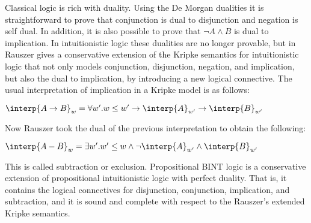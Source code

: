 Classical logic is rich with duality.  Using the De Morgan dualities
it is straightforward to prove that conjunction is dual to disjunction
and negation is self dual.  In addition, it is also possible to prove
that $\lnot A \land B$ is dual to implication.  In intuitionistic
logic these dualities are no longer provable, but in
\cite{Rauszer:1974} Rauszer gives a conservative extension of the
Kripke semantics for intuitionistic logic that not only models
conjunction, disjunction, negation, and implication, but also the dual
to implication, by introducing a new logical connective. The usual
interpretation of implication in a Kripke model is as follows:
\begin{center}
  \begin{math}
    \interp{A \to B}_w = \forall w'.w \leq w' \to \interp{A}_{w'} \to \interp{B}_{w'}
  \end{math}
\end{center}
Now Rauszer took the dual of the previous interpretation to obtain the following:
\begin{center}
  \begin{math}
    \interp{A - B}_w = \exists w'.w' \leq w \land \lnot\interp{A}_{w'} \land \interp{B}_{w'}
  \end{math}
\end{center}
This is called subtraction or exclusion.
Propositional BINT logic is a conservative extension of propositional
intuitionistic logic with perfect duality.  That is, it contains the
logical connectives for disjunction, conjunction, implication, and
subtraction, and it is sound and complete with respect to the
Rauszer's extended Kripke semantics.

